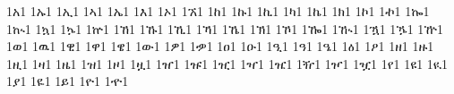 {1አ1 %
1ኡ1 %
1ኢ1 %
1ኣ1 %
1ኤ1 %
1እ1 %
1ኦ1 %
1ኧ1 %
1ከ1 %
1ኩ1 %
1ኪ1 %
1ካ1 %
1ኬ1 %
1ክ1 %
1ኮ1 %
1ኯ1 %
1ኰ1 %
1ኲ1 %
1ኳ1 %
1ኴ1 %
1ኵ1 %
1ኸ1 %
1ኹ1 %
1ኺ1 %
1ኻ1 %
1ኼ1 %
1ኽ1 %
1ኾ1 %
1ዀ1 %
1ዂ1 %
1ዃ1 %
1ዄ1 %
1ዅ1 %
1ወ1 %
1ዉ1 %
1ዊ1 %
1ዋ1 %
1ዌ1 %
1ው1 %
1ዎ1 %
1ዏ1 %
1ዐ1 %
1ዑ1 %
1ዒ1 %
1ዓ1 %
1ዔ1 %
1ዕ1 %
1ዖ1 %
1ዘ1 %
1ዙ1 %
1ዚ1 %
1ዛ1 %
1ዜ1 %
1ዝ1 %
1ዞ1 %
1ዟ1 %
1ዠ1 %
1ዡ1 %
1ዢ1 %
1ዣ1 %
1ዤ1 %
1ዥ1 %
1ዦ1 %
1ዧ1 %
1የ1 %
1ዩ1 %
1ዪ1 %
1ያ1 %
1ዬ1 %
1ይ1 %
1ዮ1 %
1ዯ1 %
}
